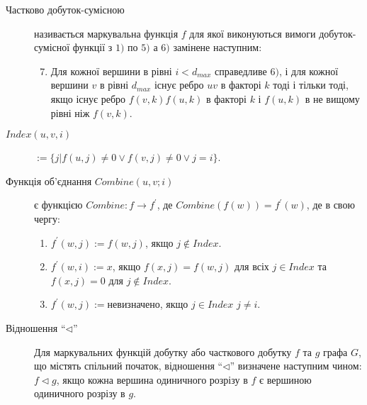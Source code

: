 \begin{description}
\begin{enumerate}
  \end{enumerate}
  \item[Частково добуток-сумісною] називається маркувальна функція $f$ для якої виконуються вимоги добуток-сумісної функції з $1)$ по $5)$ а $6)$ замінене наступним:
    \begin{enumerate}
      \setcounter{enumi}{6}
      \item Для кожної вершини в рівні $i < d_{max}$ справедливе $6)$, і для кожної вершини $v$ в рівні $d_{max}$ існує ребро $uv$ в факторі $k$ тоді і тільки тоді, якщо існує ребро $f(v,k)f(u,k)$ в факторі $k$ і $f(u,k)$ в не вищому рівні ніж $f(v,k)$.
    \end{enumerate}
    \item[$Index(u,v,i)$] $:=\lbrace j \vert f(u,j) \ne 0 \lor f(v,j) \ne 0 \lor j = i \rbrace$.
    \item[Функція об'єднання $Combine (u,v;i)$] є функцією $Combine : f \to f^\prime$, де $Combine(f(w))=f^\prime(w)$, де в свою чергу:
      \begin{enumerate}
        \item $f^\prime(w,j):=f(w,j)$, якщо $j \not\in Index$.
        \item $f^\prime(w,i):=x$, якщо $f(x,j)=f(w,j)$ для всіх $j \in Index$ та $f(x,j) = 0$ для $j \not\in Index$.
        \item $f^\prime(w,j):=$невизначено, якщо $j \in Index$ $j \ne i$.
      \end{enumerate}
      \item[Відношення ``$\triangleleft$''] Для маркувальних функцій добутку або часткового добутку $f$ та $g$ графа $G$, що містять спільний початок, відношення ``$\triangleleft$'' визначене наступним чином: $f \triangleleft g$, якщо кожна вершина одиничного розрізу в $f$ є вершиною одиничного розрізу в $g$.
\end{description}
